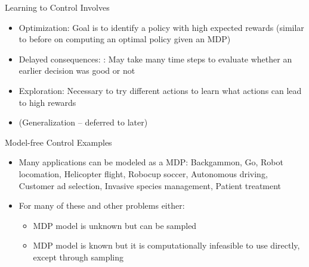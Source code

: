 \begin{frame}[c]{Learning to Control Involves}
	
	\begin{itemize}
		\item Optimization: Goal is to identify a policy with high expected rewards (similar to before on computing an optimal policy \alert{given} an MDP)
		\item Delayed consequences: : May take many time steps to evaluate whether an earlier decision was good or not
		\item Exploration: Necessary to try different actions to learn what actions can lead to high rewards
		\item (Generalization -- deferred to later)
	\end{itemize}
	
\end{frame}
\begin{frame}[c]{Model-free Control Examples}
	
	\begin{itemize}¸
		\item Many applications can be modeled as a MDP: Backgammon, Go, Robot locomation, Helicopter flight, Robocup soccer, Autonomous driving, Customer ad selection, Invasive species management, Patient
		treatment
		\item For many of these and other problems either:
		\begin{itemize}
			\item MDP model is unknown but can be sampled
			\item MDP model is known but it is computationally infeasible to use directly, except through sampling
		\end{itemize}
	\end{itemize}
	
\end{frame}
